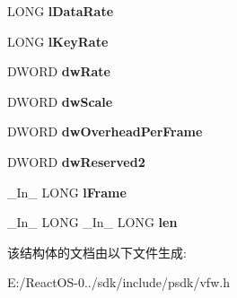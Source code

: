 \begin{DoxyCompactItemize}
L\+O\+NG {\bfseries l\+Data\+Rate}
\item 
\mbox{\label{struct_i_c_c_o_m_p_r_e_s_s_f_r_a_m_e_s_a4445d05a1501c8dcefa81fa41f62dde3}} 
L\+O\+NG {\bfseries l\+Key\+Rate}
\item 
\mbox{\label{struct_i_c_c_o_m_p_r_e_s_s_f_r_a_m_e_s_a86b8ac9f60f8caf3d6266a9edc0818bf}} 
D\+W\+O\+RD {\bfseries dw\+Rate}
\item 
\mbox{\label{struct_i_c_c_o_m_p_r_e_s_s_f_r_a_m_e_s_a5a6b7876566a4c7add58f28fa21a694b}} 
D\+W\+O\+RD {\bfseries dw\+Scale}
\item 
\mbox{\label{struct_i_c_c_o_m_p_r_e_s_s_f_r_a_m_e_s_a717956c35c3c65073ea632db0c3696e7}} 
D\+W\+O\+RD {\bfseries dw\+Overhead\+Per\+Frame}
\item 
\mbox{\label{struct_i_c_c_o_m_p_r_e_s_s_f_r_a_m_e_s_a59af2f30006a6dad5a79374f12eec6af}} 
D\+W\+O\+RD {\bfseries dw\+Reserved2}
\item 
\mbox{\label{struct_i_c_c_o_m_p_r_e_s_s_f_r_a_m_e_s_ab3d5b33be697c2b53cd3be9e0d2d1cc5}} 
\+\_\+\+In\+\_\+ L\+O\+NG {\bfseries l\+Frame}
\item 
\mbox{\label{struct_i_c_c_o_m_p_r_e_s_s_f_r_a_m_e_s_a206ad0b3f0c194904753fca5ed5084b5}} 
\+\_\+\+In\+\_\+ L\+O\+NG \+\_\+\+In\+\_\+ L\+O\+NG {\bfseries len}
\end{DoxyCompactItemize}


该结构体的文档由以下文件生成\+:\begin{DoxyCompactItemize}
\item 
E\+:/\+React\+O\+S-\/0../sdk/include/psdk/vfw.\+h\end{DoxyCompactItemize}
